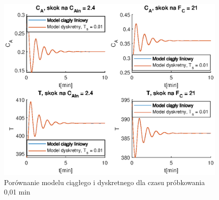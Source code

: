 \begin{figure}
\centering
\includegraphics[width=.8\linewidth]{plot/dysk_01.eps}
\caption{Porównanie modelu ciągłego i dyskretnego dla czasu próbkowania 0,01 min}
\label{fig:dys001}
\end{figure}
